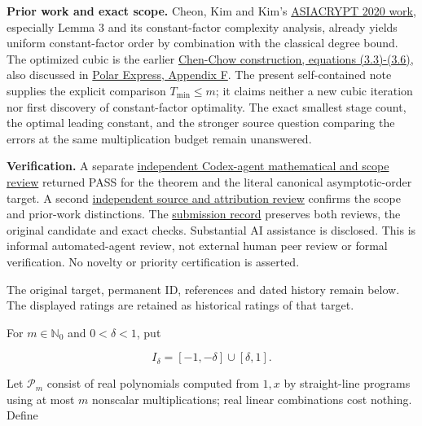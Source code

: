 \documentclass[11pt,a4paper]{article}
\makeatletter
\renewcommand{\subsection}{\Needspace{4\baselineskip}\@startsection{subsection}{2}{0pt}{9pt plus 1pt minus 1pt}{3pt}{\sffamily\bfseries\normalsize\color{ink}}}
\makeatother
\begin{document}
\textbf{Prior work and exact scope.} Cheon, Kim and Kim's
\href{https://doi.org/10.1007/978-3-030-64834-3_8}{ASIACRYPT 2020 work},
especially Lemma 3 and its constant-factor complexity analysis, already
yields uniform constant-factor order by combination with the classical
degree bound. The optimized cubic is the earlier
\href{https://www.mcs.anl.gov/papers/P5059-0114.pdf}{Chen-Chow
construction, equations (3.3)-(3.6)}, also discussed in
\href{https://arxiv.org/html/2505.16932v5}{Polar Express, Appendix F}.
The present self-contained note supplies the explicit comparison
\(T_{\min}\le m\); it claims neither a new cubic iteration nor first
discovery of constant-factor optimality. The exact smallest stage count,
the optimal leading constant, and the stronger source question comparing
the errors at the same multiplication budget remain unanswered.

\textbf{Verification.} A separate
\href{https://github.com/ajt60gaibb/OpenProblemsInNLA/blob/main/references/stepaniants-mf02-2026-09-12/verification/independent-review/MF-02-independent-review.md}{independent
Codex-agent mathematical and scope review} returned PASS for the theorem
and the literal canonical asymptotic-order target. A second
\href{https://github.com/ajt60gaibb/OpenProblemsInNLA/blob/main/references/stepaniants-mf02-2026-09-12/verification/source-review/REVIEW.md}{independent
source and attribution review} confirms the scope and prior-work
distinctions. The
\href{https://github.com/ajt60gaibb/OpenProblemsInNLA/blob/main/references/stepaniants-mf02-2026-09-12/README.md}{submission
record} preserves both reviews, the original candidate and exact checks.
Substantial AI assistance is disclosed. This is informal automated-agent
review, not external human peer review or formal verification. No
novelty or priority certification is asserted.

The original target, permanent ID, references and dated history remain
below. The displayed ratings are retained as historical ratings of that
target.

\newpage

\subsection{Context and notation}\label{context-and-notation}

For \(m\in\mathbb N_0\) and \(0<\delta<1\), put

\[
I_\delta=[-1,-\delta]\cup[\delta,1].
\]

Let \(\mathcal P_m\) consist of real polynomials computed from \(1,x\)
by straight-line programs using at most \(m\) nonscalar multiplications;
real linear combinations cost nothing. Define
\end{document}
